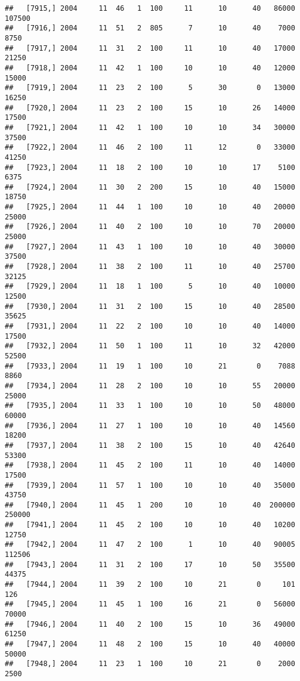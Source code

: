 \documentclass{article}\usepackage[]{graphicx}\usepackage[]{color}
\makeatletter
\newenvironment{kframe}{%
 \def\at@end@of@kframe{}%
 \ifinner\ifhmode%
  \def\at@end@of@kframe{\end{minipage}}%
  \begin{minipage}{\columnwidth}%
 \fi\fi%
 \def\FrameCommand##1{\hskip\@totalleftmargin \hskip-\fboxsep
 \colorbox{shadecolor}{##1}\hskip-\fboxsep
     \hskip-\linewidth \hskip-\@totalleftmargin \hskip\columnwidth}%
 \MakeFramed {\advance\hsize-\width
   \@totalleftmargin\z@ \linewidth\hsize
   \@setminipage}}%
 {\par\unskip\endMakeFramed%
 \at@end@of@kframe}
\newenvironment{knitrout}{}{} %
\makeatother
\begin{document}
\begin{knitrout}
\begin{kframe}
\begin{verbatim}
##   [7915,] 2004     11  46   1  100     11      10      40   86000  107500
##   [7916,] 2004     11  51   2  805      7      10      40    7000    8750
##   [7917,] 2004     11  31   2  100     11      10      40   17000   21250
##   [7918,] 2004     11  42   1  100     10      10      40   12000   15000
##   [7919,] 2004     11  23   2  100      5      30       0   13000   16250
##   [7920,] 2004     11  23   2  100     15      10      26   14000   17500
##   [7921,] 2004     11  42   1  100     10      10      34   30000   37500
##   [7922,] 2004     11  46   2  100     11      12       0   33000   41250
##   [7923,] 2004     11  18   2  100     10      10      17    5100    6375
##   [7924,] 2004     11  30   2  200     15      10      40   15000   18750
##   [7925,] 2004     11  44   1  100     10      10      40   20000   25000
##   [7926,] 2004     11  40   2  100     10      10      70   20000   25000
##   [7927,] 2004     11  43   1  100     10      10      40   30000   37500
##   [7928,] 2004     11  38   2  100     11      10      40   25700   32125
##   [7929,] 2004     11  18   1  100      5      10      40   10000   12500
##   [7930,] 2004     11  31   2  100     15      10      40   28500   35625
##   [7931,] 2004     11  22   2  100     10      10      40   14000   17500
##   [7932,] 2004     11  50   1  100     11      10      32   42000   52500
##   [7933,] 2004     11  19   1  100     10      21       0    7088    8860
##   [7934,] 2004     11  28   2  100     10      10      55   20000   25000
##   [7935,] 2004     11  33   1  100     10      10      50   48000   60000
##   [7936,] 2004     11  27   1  100     10      10      40   14560   18200
##   [7937,] 2004     11  38   2  100     15      10      40   42640   53300
##   [7938,] 2004     11  45   2  100     11      10      40   14000   17500
##   [7939,] 2004     11  57   1  100     10      10      40   35000   43750
##   [7940,] 2004     11  45   1  200     10      10      40  200000  250000
##   [7941,] 2004     11  45   2  100     10      10      40   10200   12750
##   [7942,] 2004     11  47   2  100      1      10      40   90005  112506
##   [7943,] 2004     11  31   2  100     17      10      50   35500   44375
##   [7944,] 2004     11  39   2  100     10      21       0     101     126
##   [7945,] 2004     11  45   1  100     16      21       0   56000   70000
##   [7946,] 2004     11  40   2  100     15      10      36   49000   61250
##   [7947,] 2004     11  48   2  100     15      10      40   40000   50000
##   [7948,] 2004     11  23   1  100     10      21       0    2000    2500

\end{verbatim}
\end{kframe}
\end{knitrout}
\end{document}
